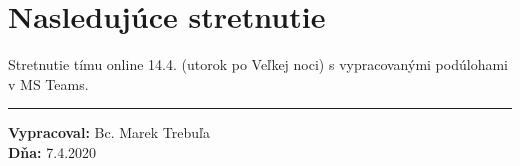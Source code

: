     \section*{Nasledujúce stretnutie}
    
    Stretnutie tímu online 14.4. (utorok po Veľkej noci) s vypracovanými podúlohami v MS Teams.

    
    \noindent\rule{15cm}{0.4pt}
   {\small 	\textbf{Vypracoval:} Bc. Marek Trebuľa\\
   \textbf{Dňa:} 7.4.2020 }
    

